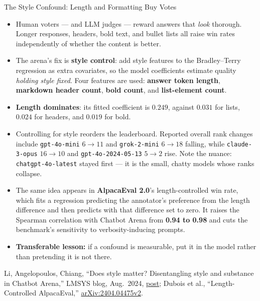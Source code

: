\begin{frame}{The Style Confound: Length and Formatting Buy Votes}
  \begin{itemize}\footnotesize\itemsep0.05em
    \item[\textcolor{red}{$\blacktriangleright$}] Human voters --- and LLM judges --- reward answers that \textit{look} thorough. Longer responses, headers, bold text, and bullet lists all raise win rates independently of whether the content is better.
    \item[\textcolor{red}{$\blacktriangleright$}] The arena's fix is \textbf{style control}: add style features to the Bradley--Terry regression as extra covariates, so the model coefficients estimate quality \textit{holding style fixed}. Four features are used: \textbf{answer token length}, \textbf{markdown header count}, \textbf{bold count}, and \textbf{list-element count}.
    \item[\textcolor{red}{$\blacktriangleright$}] \textbf{Length dominates}: its fitted coefficient is $0.249$, against $0.031$ for lists, $0.024$ for headers, and $0.019$ for bold.
    \item[\textcolor{red}{$\blacktriangleright$}] Controlling for style reorders the leaderboard. Reported overall rank changes include \texttt{gpt-4o-mini} $6 \rightarrow 11$ and \texttt{grok-2-mini} $6 \rightarrow 18$ falling, while \texttt{claude-3-opus} $16 \rightarrow 10$ and \texttt{gpt-4o-2024-05-13} $5 \rightarrow 2$ rise. Note the nuance: \texttt{chatgpt-4o-latest} stayed first --- it is the small, chatty models whose ranks collapse.
    \item[\textcolor{red}{$\blacktriangleright$}] The same idea appears in \textbf{AlpacaEval 2.0}'s length-controlled win rate, which fits a regression predicting the annotator's preference from the length difference and then predicts with that difference set to zero. It raises the Spearman correlation with Chatbot Arena from \textbf{0.94 to 0.98} and cuts the benchmark's sensitivity to verbosity-inducing prompts.
    \item[\textcolor{red}{$\blacktriangleright$}] \textbf{Transferable lesson:} if a confound is measurable, put it in the model rather than pretending it is not there.
  \end{itemize}
  {\scriptsize Li, Angelopoulos, Chiang, ``Does style matter? Disentangling style and substance in Chatbot Arena,'' LMSYS blog, Aug.\ 2024, \href{https://www.lmsys.org/blog/2024-08-28-style-control/}{post}; Dubois et al., ``Length-Controlled AlpacaEval,'' \href{https://arxiv.org/abs/2404.04475v2}{arXiv:2404.04475v2}.}
\end{frame}


